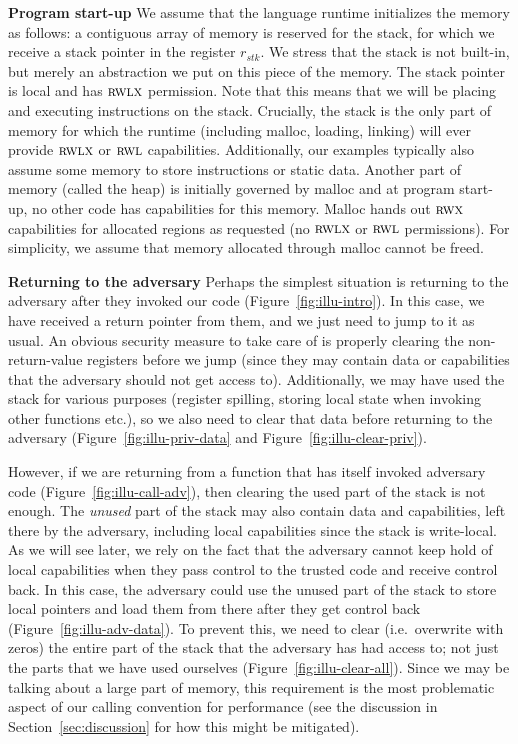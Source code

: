 \documentclass[format=acmsmall, review=true, screen=true]{acmart}
\renewcommand{\figurename}{Figure}
\renewcommand{\sectionname}{Section}
\newcommand{\var}[1]{\mathit{#1}}
\newcommand{\stk}{\var{stk}}
\newcommand{\plainperm}[1]{\textsc{#1}}
\newcommand{\rwx}{\plainperm{rwx}}
\newcommand{\readwritel}{\plainperm{rwl}}
\newcommand{\rwl}{\readwritel}
\newcommand{\rwlx}{\plainperm{rwlx}}
\newcommand{\itoplas}[1]%
    {{\color{OliveGreen} #1}}
\begin{document}
\textbf{Program start-up} We assume that the language runtime initializes the
memory as follows: a contiguous array of memory is reserved for the stack, for
which we receive a stack pointer in the register $r_\stk$. We stress that
the stack is not built-in, but merely an abstraction we put on this piece of the
memory. The stack pointer is local and has $\rwlx$ permission. Note that this
means that we will be placing and executing instructions on the stack.
Crucially, the stack is the only part of memory for which the runtime (including
malloc, loading, linking) will ever provide $\rwlx$ or $\rwl$ capabilities.
Additionally, our examples typically also assume some memory to store
instructions or static data. Another part of memory (called the heap) is
initially governed by malloc and at program start-up, no other code has
capabilities for this memory. Malloc hands out $\rwx$ capabilities for allocated
regions as requested (no $\rwlx$ or $\rwl$ permissions). For simplicity, we
assume that memory allocated through malloc cannot be freed.

\textbf{Returning to the adversary} Perhaps the simplest situation is returning
to the adversary after they invoked our code \itoplas{(\figurename~\ref{fig:illu-intro})}. In this case, we have received a
return pointer from them, and we just need to jump to it as usual. An obvious
security measure to take care of is properly clearing the non-return-value
registers before we jump (since they may contain data or capabilities that the
adversary should not get access to). Additionally, we may have used the stack
for various purposes (register spilling, storing local state when invoking other
functions etc.), so we also need to clear that data before returning to the
adversary \itoplas{(\figurename~\ref{fig:illu-priv-data} and \figurename~\ref{fig:illu-clear-priv})}.

However, if we are returning from a function that has itself invoked adversary
code \itoplas{(\figurename~\ref{fig:illu-call-adv})}, then clearing the used part of the stack is not enough. The \emph{unused}
part of the stack may also contain data and capabilities, left there by the
adversary, including local capabilities since the stack is write-local. As we
will see later, we rely on the fact that the adversary cannot keep hold of local
capabilities when they pass control to the trusted code and receive control
back. In this case, the adversary could use the unused part of the stack to
store local pointers and load them from there after they get control back
\itoplas{(\figurename~\ref{fig:illu-adv-data})}. To
prevent this, we need to clear (i.e.\ overwrite with zeros) the entire part of
the stack that the adversary has had access to; not just the parts that we have
used ourselves \itoplas{(\figurename~\ref{fig:illu-clear-all})}. Since we may be talking about a large part of memory, this
requirement is the most problematic aspect of our calling convention for
performance (see the discussion in \sectionname~\ref{sec:discussion} for how this might be
mitigated).
\end{document}
